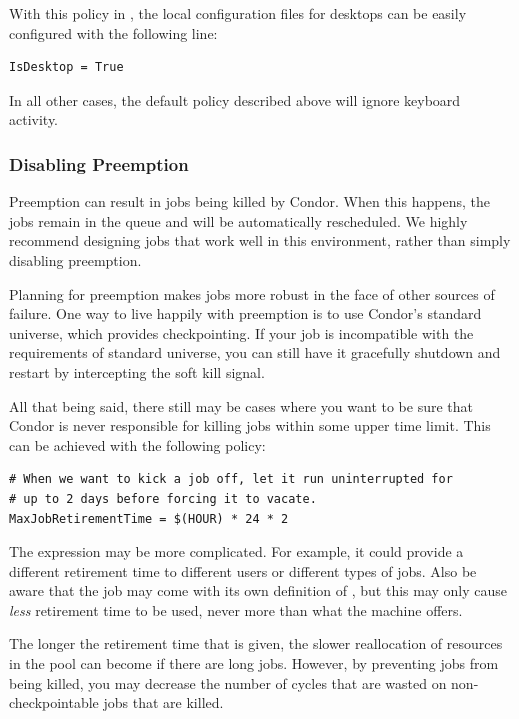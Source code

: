 With this policy in , the local configuration files for
desktops can be easily configured with the following line:

\begin{verbatim}
IsDesktop = True
\end{verbatim}

In all other cases, the default policy described above will ignore
keyboard activity.

\subsubsection{\label{sec:Disabling Preemption}
Disabling Preemption}

Preemption can result in jobs being killed by Condor.  When this
happens, the jobs remain in the queue and will be automatically
rescheduled.  We highly recommend designing jobs that work well in
this environment, rather than simply disabling preemption.

Planning for preemption makes jobs more robust in the face of other
sources of failure.  One way to live happily with preemption is to use
Condor's standard universe, which provides checkpointing.  If your job
is incompatible with the requirements of standard universe, you can
still have it gracefully shutdown and restart by intercepting the soft
kill signal.

All that being said, there still may be cases where you want to be
sure that Condor is never responsible for killing jobs within some
upper time limit.  This can be achieved with the following policy:

\begin{verbatim}
# When we want to kick a job off, let it run uninterrupted for
# up to 2 days before forcing it to vacate.
MaxJobRetirementTime = $(HOUR) * 24 * 2
\end{verbatim}

The expression may be more complicated.  For example, it could provide
a different retirement time to different users or different types of
jobs.  Also be aware that the job may come with its own definition
of , but this may only cause \emph{less}
retirement time to be used, never more than what the machine offers.

The longer the retirement time that is given, the slower reallocation
of resources in the pool can become if there are long jobs.  However,
by preventing jobs from being killed, you may decrease the number of
cycles that are wasted on non-checkpointable jobs that are killed.

